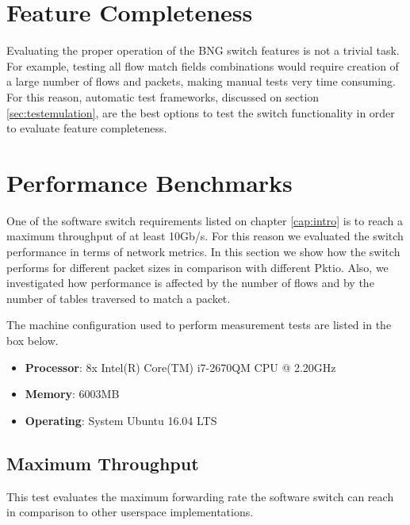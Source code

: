 


\section{Feature Completeness}
\label{sec:FeatureComplete}
Evaluating the proper operation of the BNG switch features is not a trivial task. For example, testing all flow match fields combinations would require creation of a large number of flows and packets, making manual tests very time consuming. For this reason, automatic test frameworks, discussed on section \ref{sec:testemulation}, are the best options to test the switch functionality in order to evaluate feature completeness.    

\section{Performance Benchmarks}

One of the software switch requirements listed on chapter \ref{cap:intro} is to reach a maximum throughput of at least 10Gb/s. For this reason we evaluated the switch performance in terms of network metrics. In this section we show how the switch performs for different packet sizes in comparison with different Pktio. Also, we investigated how performance is affected by the number of flows and by the number of tables traversed to match a packet.  

The machine configuration used to perform measurement tests are listed in the box below. 

\begin{framed}

\begin{itemize}
\item \textbf{Processor}:	8x Intel(R) Core(TM) i7-2670QM CPU @ 2.20GHz
\item \textbf{Memory}:	6003MB 
\item \textbf{Operating}: System	Ubuntu 16.04 LTS
\end{itemize}

\end{framed}

    \subsection{Maximum Throughput}
    \label{sec:MaxBand}
    This test evaluates the maximum forwarding rate the software switch can reach in comparison to other userspace implementations. 
    
